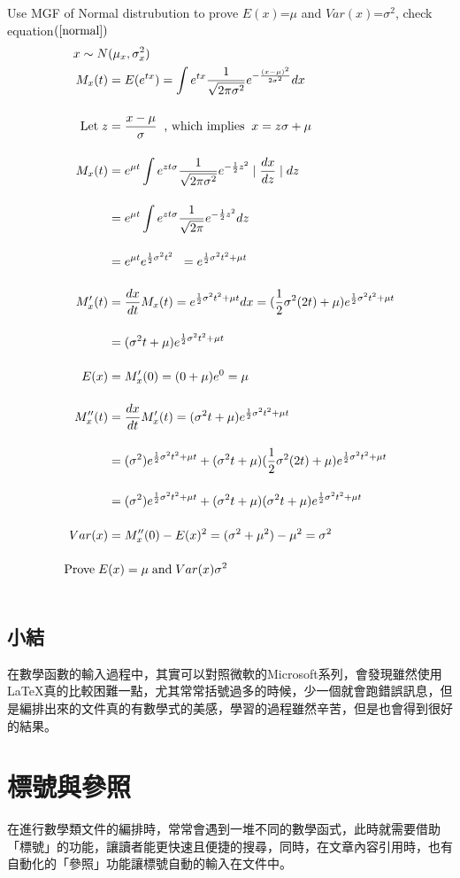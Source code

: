 \begin{try} Use MGF of Normal distrubution to prove $E(x)$=$\mu$ and $Var(x)$=$\sigma^2$, check equation$(\ref{normal})$
\begin{align}\label{normal}
x \sim N&(\mu_{x}, \sigma_{x}^2)\notag\\
 M_x(t)&=E(e^{tx}) = \int e^{tx}\frac{1}{\sqrt{2\pi\sigma^2}}e^{-\frac{(x-\mu)^2}{2\sigma^2}}dx\notag\\[4mm]
 \mbox{Let}\; z&=\frac{x-\mu}{\sigma}\;\; \mbox{, which implies}\;\; x = z\sigma + \mu\notag\\[4mm]
 M_x(t)&=e^{\mu t}\int e^{zt\sigma}\frac{1}{\sqrt{2\pi\sigma^2}}e^{-\frac{1}{2}z^2}\mid\frac{dx}{dz}\mid dz\notag\\[4mm]
 &=e^{\mu t}\int e^{zt\sigma}\frac{1}{\sqrt{2\pi}}e^{-\frac{1}{2}z^2}dz\notag\\[4mm]
&=e^{\mu t} e^{\frac{1}{2}\sigma^2t^2}\notag \;\;=e^{\frac{1}{2}\sigma^2t^2+\mu t}\notag\\[4mm]
  M_x'(t)&=\frac{dx}{dt}M_x(t)=e^{\frac{1}{2}\sigma^2t^2+\mu t}dx=(\frac{1}{2}\sigma^2(2t)+\mu)e^{\frac{1}{2}\sigma^2t^2+\mu t}\\[4mm]
  &=(\sigma^2t+\mu)e^{\frac{1}{2}\sigma^2t^2+\mu t}\notag\\[4mm]
  E(x)&=M_x'(0)=(0+\mu)e^0=\mu\notag\\[4mm]
    M_x''(t)&=\frac{dx}{dt}M_x'(t)=(\sigma^2t+\mu)e^{\frac{1}{2}\sigma^2t^2+\mu t}\notag\\[4mm]
    &=(\sigma^2)e^{\frac{1}{2}\sigma^2t^2+\mu t}+(\sigma^2t+\mu)(\frac{1}{2}\sigma^2(2t)+\mu)e^{\frac{1}{2}\sigma^2t^2+\mu t}\notag\\[4mm]
    &=(\sigma^2)e^{\frac{1}{2}\sigma^2t^2+\mu t}+(\sigma^2t+\mu)(\sigma^2 t+\mu)e^{\frac{1}{2}\sigma^2t^2+\mu t}\notag\\[4mm]
  Var(x)&=M_x''(0)-E(x)^2=(\sigma^2+\mu^2)-\mu^2=\sigma^2\notag\\[4mm]
  \mbox{Prove}\; E&(x)=\mu \;\mbox{and}\;Var(x)\sigma^2\notag\\\notag
\end{align}
\end{try} 
\section*{小結}
在數學函數的輸入過程中，其實可以對照微軟的Microsoft系列，會發現雖然使用\LaTeX 真的比較困難一點，尤其常常括號過多的時候，少一個就會跑錯誤訊息，但是編排出來的文件真的有數學式的美感，學習的過程雖然辛苦，但是也會得到很好的結果。
\chapter{標號與參照}
在進行數學類文件的編排時，常常會遇到一堆不同的數學函式，此時就需要借助「標號」的功能，讓讀者能更快速且便捷的搜尋，同時，在文章內容引用時，也有自動化的「參照」功能讓標號自動的輸入在文件中。
